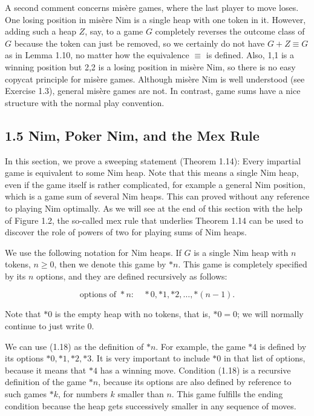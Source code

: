 \documentclass[12pt]{article}
\begin{document}
A second comment concerns misère games, where the last player to move loses. One losing position in misère Nim is a single heap with one token in it. However, adding such a heap $Z$, say, to a game $G$ completely reverses the outcome class of $G$ because the token can just be removed, so we certainly do not have $G+Z \equiv G$ as in Lemma 1.10, no matter how the equivalence $\equiv$ is defined. Also, 1,1 is a winning position but 2,2 is a losing position in misère Nim, so there is no easy copycat principle for misère games. Although misère Nim is well understood (see Exercise 1.3), general misère games are not. In contrast, game sums have a nice structure with the normal play convention.

\subsection*{1.5 Nim, Poker Nim, and the Mex Rule}
In this section, we prove a sweeping statement (Theorem 1.14): Every impartial game is equivalent to some Nim heap. Note that this means a single Nim heap, even if the game itself is rather complicated, for example a general Nim position, which is a game sum of several Nim heaps. This can proved without any reference to playing Nim optimally. As we will see at the end of this section with the help of Figure 1.2, the so-called mex rule that underlies Theorem 1.14 can be used to discover the role of powers of two for playing sums of Nim heaps.

We use the following notation for Nim heaps. If $G$ is a single Nim heap with $n$ tokens, $n \geq 0$, then we denote this game by $* n$. This game is completely specified by its $n$ options, and they are defined recursively as follows:


\begin{equation*}
\text { options of } * n: \quad * 0, * 1, * 2, \ldots, *(n-1) \text {. } \tag{1.18}
\end{equation*}


Note that $* 0$ is the empty heap with no tokens, that is, $* 0=0$; we will normally continue to just write 0.

We can use (1.18) as the definition of $* n$. For example, the game $* 4$ is defined by its options $* 0, * 1, * 2, * 3$. It is very important to include $* 0$ in that list of options, because it means that $* 4$ has a winning move. Condition (1.18) is a recursive definition of the game $* n$, because its options are also defined by reference to such games $* k$, for numbers $k$ smaller than $n$. This game fulfills the ending condition because the heap gets successively smaller in any sequence of moves.
\end{document}
